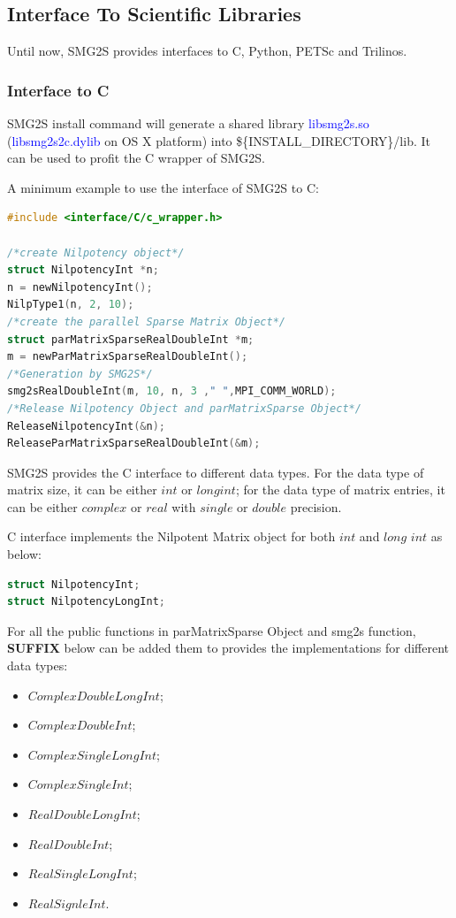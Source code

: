 \subsection{Interface To Scientific Libraries}

Until now, SMG2S provides interfaces to C, Python, PETSc and Trilinos.

\subsubsection{Interface to C}
SMG2S install command will generate a shared library \textcolor{blue}{libsmg2s.so} (\textcolor{blue}{libsmg2s2c.dylib} on OS X platform) into \$\{INSTALL\_DIRECTORY\}/lib. It can be used to profit the C wrapper of SMG2S. 

A minimum example to use the interface of SMG2S to C:

\begin{lstlisting}[language=C,frame=single]
#include <interface/C/c_wrapper.h>

/*create Nilpotency object*/
struct NilpotencyInt *n;
n = newNilpotencyInt();
NilpType1(n, 2, 10);
/*create the parallel Sparse Matrix Object*/
struct parMatrixSparseRealDoubleInt *m;
m = newParMatrixSparseRealDoubleInt();
/*Generation by SMG2S*/
smg2sRealDoubleInt(m, 10, n, 3 ," ",MPI_COMM_WORLD);
/*Release Nilpotency Object and parMatrixSparse Object*/
ReleaseNilpotencyInt(&n);
ReleaseParMatrixSparseRealDoubleInt(&m);
\end{lstlisting}

SMG2S provides the C interface to different data types. For the data type of matrix size, it can be either $int$ or $long int$; for the data type of matrix entries, it can be either $complex$ or $real$ with $single$ or $double$ precision.

C interface implements the Nilpotent Matrix object for both $int$ and $long$ $int$ as below:
\begin{lstlisting}[language=C,frame=single,	basicstyle=\footnotesize]
struct NilpotencyInt;
struct NilpotencyLongInt;
\end{lstlisting}

For all the public functions  in parMatrixSparse Object and smg2s function, \textbf{SUFFIX} below can be added them to provides the implementations for different data types:

\begin{multicols}{2}
	\begin{itemize}
		\item $ComplexDoubleLongInt$;
		\item $ComplexDoubleInt$;
		\item $ComplexSingleLongInt$;
		\item $ComplexSingleInt$;
		\item $RealDoubleLongInt$;
		\item $RealDoubleInt$;
		\item $RealSingleLongInt$;
		\item $RealSignleInt$.
	\end{itemize}
\end{multicols}


